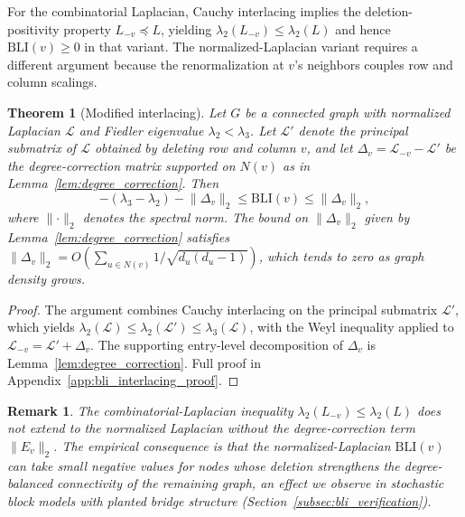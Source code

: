 \documentclass[12pt, a4paper]{article}
\newtheorem{theorem}{Theorem}
\newtheorem*{remark}{Remark}
\begin{document}
For the combinatorial Laplacian, Cauchy interlacing implies the deletion-positivity property $L_{-v} \preceq L$, yielding $\lambda_2(L_{-v}) \leq \lambda_2(L)$ and hence $\mathrm{BLI}(v) \geq 0$ in that variant. The normalized-Laplacian variant requires a different argument because the renormalization at $v$'s neighbors couples row and column scalings.

\begin{theorem}[Modified interlacing]\label{thm:interlacing}
Let $G$ be a connected graph with normalized Laplacian $\mathcal{L}$ and Fiedler eigenvalue $\lambda_2 < \lambda_3$. Let $\mathcal{L}'$ denote the principal submatrix of $\mathcal{L}$ obtained by deleting row and column $v$, and let $\Delta_v = \mathcal{L}_{-v} - \mathcal{L}'$ be the degree-correction matrix supported on $N(v)$ as in Lemma~\ref{lem:degree_correction}. Then
\begin{equation}\label{eq:interlacing_bound}
-(\lambda_3 - \lambda_2) - \lVert \Delta_v \rVert_2 \leq \mathrm{BLI}(v) \leq \lVert \Delta_v \rVert_2,
\end{equation}
where $\lVert \cdot \rVert_2$ denotes the spectral norm. The bound on $\lVert \Delta_v \rVert_2$ given by Lemma~\ref{lem:degree_correction} satisfies $\lVert \Delta_v \rVert_2 = O\!\left( \sum_{u \in N(v)} 1/\sqrt{d_u(d_u-1)} \right)$, which tends to zero as graph density grows.
\end{theorem}

\begin{proof}
The argument combines Cauchy interlacing on the principal submatrix $\mathcal{L}'$, which yields $\lambda_2(\mathcal{L}) \leq \lambda_2(\mathcal{L}') \leq \lambda_3(\mathcal{L})$, with the Weyl inequality applied to $\mathcal{L}_{-v} = \mathcal{L}' + \Delta_v$. The supporting entry-level decomposition of $\Delta_v$ is Lemma~\ref{lem:degree_correction}. Full proof in Appendix~\ref{app:bli_interlacing_proof}.
\end{proof}

\begin{remark}
The combinatorial-Laplacian inequality $\lambda_2(L_{-v}) \leq \lambda_2(L)$ does not extend to the normalized Laplacian without the degree-correction term $\lVert E_v \rVert_2$. The empirical consequence is that the normalized-Laplacian $\mathrm{BLI}(v)$ can take small negative values for nodes whose deletion strengthens the degree-balanced connectivity of the remaining graph, an effect we observe in stochastic block models with planted bridge structure (Section~\ref{subsec:bli_verification}).
\end{remark}
\end{document}
